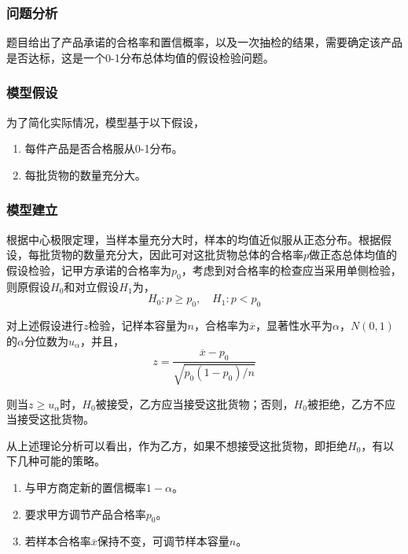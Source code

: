 
\subsubsection{问题分析}

题目给出了产品承诺的合格率和置信概率，以及一次抽检的结果，需要确定该产品是否达标，这是一个0-1分布总体均值的假设检验问题。

\subsubsection{模型假设}

为了简化实际情况，模型基于以下假设，
\begin{enumerate}
    \item 每件产品是否合格服从0-1分布。
    \item 每批货物的数量充分大。
\end{enumerate}

\subsubsection{模型建立}

根据中心极限定理，当样本量充分大时，样本的均值近似服从正态分布。根据假设，每批货物的数量充分大，因此可对这批货物总体的合格率$p$做正态总体均值的假设检验，记甲方承诺的合格率为$p_0$，考虑到对合格率的检查应当采用单侧检验，则原假设$H_0$和对立假设$H_1$为，
\begin{equation}
    H_0: p \ge p_0, \quad H_1: p < p_0
\end{equation}

对上述假设进行$z$检验，记样本容量为$n$，合格率为$\overline{x}$，显著性水平为$\alpha$，$N(0,1)$的$\alpha$分位数为$u_\alpha$，并且，
\begin{equation}
    z = \frac{\overline{x} - p_0}{\sqrt{p_0(1-p_0)/n}}
\end{equation}

则当$z \ge u_\alpha$时，$H_0$被接受，乙方应当接受这批货物；否则，$H_0$被拒绝，乙方不应当接受这批货物。

从上述理论分析可以看出，作为乙方，如果不想接受这批货物，即拒绝$H_0$，有以下几种可能的策略。
\begin{enumerate}
    \item 与甲方商定新的置信概率$1-\alpha$。
    \item 要求甲方调节产品合格率$p_0$。
    \item 若样本合格率$\overline{x}$保持不变，可调节样本容量$n$。
\end{enumerate}

